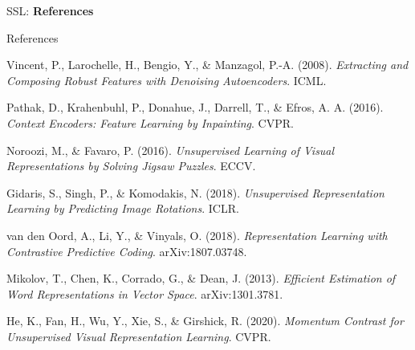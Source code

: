 \begin{frame}{}
    \LARGE SSL: \textbf{References}
\end{frame}

\begin{frame}[allowframebreaks]{References}
\begin{thebibliography}{9}

Vincent, P., Larochelle, H., Bengio, Y., \& Manzagol, P.-A. (2008). \textit{Extracting and Composing Robust Features with Denoising Autoencoders}. ICML.

Pathak, D., Krahenbuhl, P., Donahue, J., Darrell, T., \& Efros, A. A. (2016). \textit{Context Encoders: Feature Learning by Inpainting}. CVPR.

Noroozi, M., \& Favaro, P. (2016). \textit{Unsupervised Learning of Visual Representations by Solving Jigsaw Puzzles}. ECCV.

Gidaris, S., Singh, P., \& Komodakis, N. (2018). \textit{Unsupervised Representation Learning by Predicting Image Rotations}. ICLR.

van den Oord, A., Li, Y., \& Vinyals, O. (2018). \textit{Representation Learning with Contrastive Predictive Coding}. arXiv:1807.03748.

Mikolov, T., Chen, K., Corrado, G., \& Dean, J. (2013). \textit{Efficient Estimation of Word Representations in Vector Space}. arXiv:1301.3781.

He, K., Fan, H., Wu, Y., Xie, S., \& Girshick, R. (2020). \textit{Momentum Contrast for Unsupervised Visual Representation Learning}. CVPR.

\end{thebibliography}
\end{frame}
